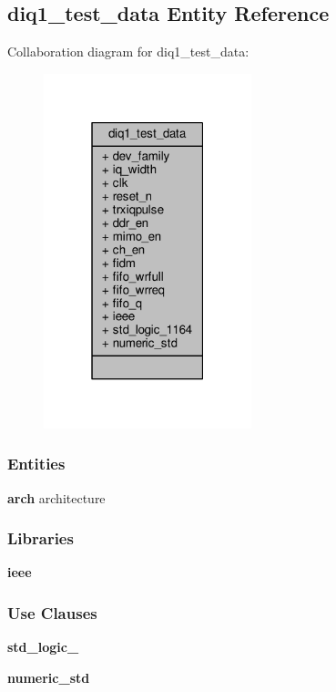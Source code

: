 \subsection{diq1\+\_\+test\+\_\+data Entity Reference}
\label{classdiq1__test__data}


Collaboration diagram for diq1\+\_\+test\+\_\+data\+:\nopagebreak
\begin{figure}[H]
\begin{center}
\leavevmode
\includegraphics[width=171pt]{d8/df0/classdiq1__test__data__coll__graph}
\end{center}
\end{figure}
\subsubsection*{Entities}
\begin{DoxyCompactItemize}
\item 
{\bf arch} architecture
\end{DoxyCompactItemize}
\subsubsection*{Libraries}
 \begin{DoxyCompactItemize}
\item 
{\bf ieee} 
\end{DoxyCompactItemize}
\subsubsection*{Use Clauses}
 \begin{DoxyCompactItemize}
\item 
{\bf std\+\_\+logic\+\_}   
\item 
{\bf numeric\+\_\+std}   
\end{DoxyCompactItemize}
